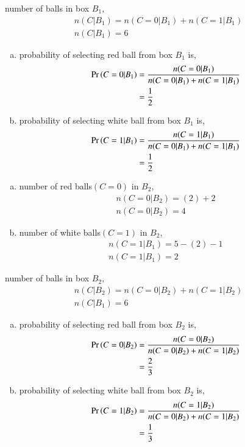 \documentclass[journal,12pt,twocolumn]{IEEEtran}
\begin{document}
number of balls in box $B_1$,
\begin{align}
    n(C|B_1)=n(C=0|B_1)+ n(C=1|B_1)\\
    n(C|B_1)=6
\end{align}

\begin{enumerate}[(a)]
\item 
probability of selecting red ball from box $B_1$ is,
\begin{align}
\begin{split}
    \Pr\left(C=0|B_1\right)&=\frac{n(C=0|B_1)}{n(C=0|B_1)+ n(C=1|B_1)}\\
    &=\frac{1}{2}
\end{split}
\end{align}
\item
probability of selecting white ball from box $B_1$ is,
\begin{align}
\begin{split}
    \Pr\left(C=1|B_1\right)&=\frac{n(C=1|B_1)}{n(C=0|B_1)+ n(C=1|B_1)}\\
    &=\frac{1}{2}
\end{split}
\end{align}
\end{enumerate}

\begin{enumerate}[(a)]
\item
number of red balls$(C=0)$ in $B_2$,
\begin{align}
    n(C=0|B_2)=(2)+2\\
    n(C=0|B_2)=4
\end{align}
\item
number of white balls$(C=1)$ in $B_2$,
\begin{align}
    n(C=1|B_1)=5-(2)-1\\
    n(C=1|B_1)=2
\end{align}
\end{enumerate}

number of balls in box $B_2$,
\begin{align}
    n(C|B_2)=n(C=0|B_2)+ n(C=1|B_2)\\
    n(C|B_1)=6
\end{align}

\begin{enumerate}[(a)]
\item
probability of selecting red ball from box $B_2$ is,
\begin{align}
\begin{split}
    \Pr\left(C=0|B_2\right)&=\frac{n(C=0|B_2)}{n(C=0|B_2)+ n(C=1|B_2)}\\
    &=\frac{2}{3}
\end{split}
\end{align}
\item
probability of selecting white ball from box $B_2$ is,
\begin{align}
\begin{split}
    \Pr\left(C=1|B_2\right)&=\frac{n(C=1|B_2)}{n(C=0|B_2)+ n(C=1|B_2)}\\
    &=\frac{1}{3}
\end{split}
\end{align}
\end{enumerate}
\end{document}
